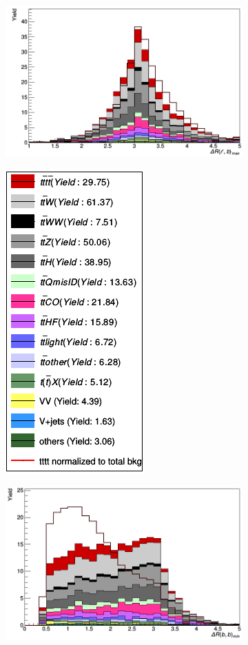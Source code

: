 \newpage

\begin{figure}[H]
\begin{subfigure}{.5\textwidth}
  \centering
  \includegraphics[width=.99\linewidth]{figs/features/deltaR_lb_max}
\end{subfigure}%
\begin{subfigure}{.5\textwidth}
  \centering
  \includegraphics[width=.29\linewidth]{figs/features/legende}
\end{subfigure}
\begin{subfigure}{.5\textwidth}
  \centering
  \includegraphics[width=.99\linewidth]{figs/features/dRbbmin}

\end{subfigure}
\end{figure}
